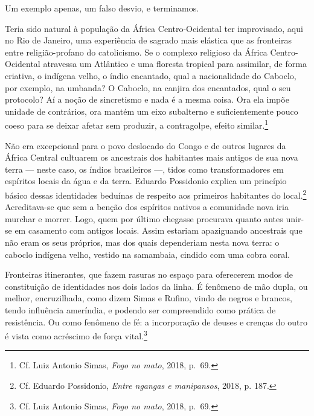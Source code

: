 Um exemplo apenas, um falso desvio, e terminamos.

Teria sido natural à população da África Centro-Ocidental ter
improvisado, aqui no Rio de Janeiro, uma experiência de sagrado mais
elástica que as fronteiras entre religião-profano do catolicismo. Se o
complexo religioso da África Centro-Ocidental atravessa um Atlântico e
uma floresta tropical para assimilar, de forma criativa, o indígena
velho, o índio encantado, qual a nacionalidade do Caboclo, por exemplo,
na umbanda? O Caboclo, na canjira dos encantados, qual o seu protocolo?
Aí a noção de sincretismo e nada é a mesma coisa. Ora ela impõe unidade
de contrários, ora mantém um eixo subalterno e suficientemente pouco
coeso para se deixar afetar sem produzir, a contragolpe, efeito
similar.\footnote{Cf. Luiz Antonio Simas, \textit{Fogo no mato}, 2018,
  p.~69.}

Não era excepcional para o povo deslocado do Congo e de outros lugares
da África Central cultuarem os ancestrais dos habitantes mais antigos de
sua nova terra --- neste caso, os índios brasileiros ---, tidos como
transformadores em espíritos locais da água e da terra. Eduardo
Possidonio explica um princípio básico dessas identidades beduínas de
respeito aos primeiros habitantes do local.\footnote{Cf. Eduardo
  Possidonio, \textit{Entre ngangas e manipansos}, 2018, p. 187.}
Acreditava-se que sem a benção dos espíritos nativos a comunidade nova
iria murchar e morrer. Logo, quem por último chegasse procurava quanto
antes unir-se em casamento com antigos locais. Assim estariam
apaziguando ancestrais que não eram os seus próprios, mas dos quais
dependeriam nesta nova terra: o caboclo indígena velho, vestido na
samambaia, cindido com uma cobra coral.

Fronteiras itinerantes, que fazem rasuras no espaço para oferecerem
modos de constituição de identidades nos dois lados da linha. É fenômeno
de mão dupla, ou melhor, encruzilhada, como dizem Simas e Rufino, vindo
de negros e brancos, tendo influência ameríndia, e podendo ser
compreendido como prática de resistência. Ou como fenômeno de fé: a
incorporação de deuses e crenças do outro é vista como acréscimo de
força vital.\footnote{Cf. Luiz Antonio Simas, \textit{Fogo no mato}, 2018,
  p.~69.}

